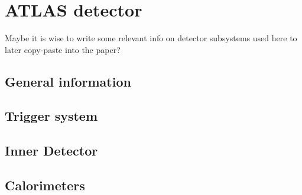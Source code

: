 \chapter{ATLAS detector}\label{chap:ATLAS}
{\red Maybe it is wise to write some relevant info on detector subsystems used here to later copy-paste into the paper?}
\section{General information}
\section{Trigger system}
\section{Inner Detector}
\section{Calorimeters}